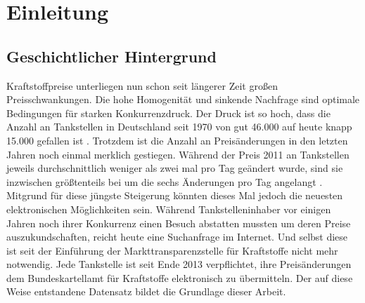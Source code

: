 \chapter{Einleitung}
\label{sec:Einleitung}

\section{Geschichtlicher Hintergrund}
Kraftstoffpreise unterliegen nun schon seit längerer Zeit großen Preisschwankungen. Die hohe Homogenität und sinkende Nachfrage sind optimale Bedingungen für starken Konkurrenzdruck. Der Druck ist so hoch, dass die Anzahl an Tankstellen in Deutschland seit 1970 von gut 46.000 auf heute knapp 15.000 gefallen ist \citep*{PraTa}. Trotzdem ist die Anzahl an Preisänderungen in den letzten Jahren noch einmal merklich gestiegen. Während der Preis 2011 an Tankstellen jeweils durchschnittlich weniger als zwei mal pro Tag geändert wurde, sind sie inzwischen größtenteils bei um die sechs Änderungen pro Tag angelangt \citep*{Unity}. \\


Mitgrund für diese jüngste Steigerung könnten dieses Mal jedoch die neuesten elektronischen Möglichkeiten sein. Während Tankstelleninhaber vor einigen Jahren noch ihrer Konkurrenz einen Besuch abstatten mussten um deren Preise auszukundschaften, reicht heute eine Suchanfrage im Internet. Und selbst diese ist seit der Einführung der Markttransparenzstelle für Kraftstoffe nicht mehr notwendig. Jede Tankstelle ist seit Ende 2013 verpflichtet, ihre Preisänderungen dem Bundeskartellamt für Kraftstoffe elektronisch zu übermitteln. Der auf diese Weise entstandene Datensatz  bildet die Grundlage dieser Arbeit.\\

